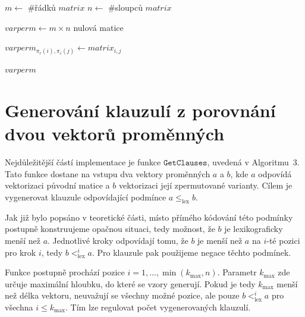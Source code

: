 \begin{algorithm}[H]
\begin{algorithmic}[1]
    	\State $m \gets$ \#řádků $matrix$
    	\State $n \gets$ \#sloupců $matrix$
    
    	\State $varperm \gets m\times n$ nulová matice 
    
            		\State $varperm_{\pi_r(i),\pi_c(j)} \gets matrix_{i,j}$
        	\EndFor
    	\EndFor
    
    	\State \Return $varperm$
\EndFunction
\end{algorithmic}
\caption{Aplikace permutací na matici}
\end{algorithm}

\section{Generování klauzulí z porovnání dvou vektorů proměnných}

Nejdůležitější částí implementace je funkce $\texttt{GetClauses}$, uvedená v Algoritmu 3. Tato funkce dostane na vstupu dva vektory proměnných $a$ a $b$, kde $a$ odpovídá vektorizaci původní matice a $b$ vektorizaci její zpermutované varianty. Cílem je vygenerovat klauzule odpovídající podmínce
$a \leq_{\text{lex}} b$.

Jak již bylo popsáno v teoretické části, místo přímého kódování této podmínky postupně konstruujeme opačnou situaci, tedy možnost, že $b$ je lexikograficky menší než $a$. Jednotlivé kroky odpovídají tomu, že $b$ je menší než $a$ na $i$-té pozici pro krok $i$, tedy $b <^i_{\text{lex}} a$. Pro klauzule pak použijeme negace těchto podmínek.

Funkce postupně prochází pozice $i = 1,\ldots,\min(k_{\max},n)$. Parametr $k_{\max}$ zde určuje maximální hloubku, do které se vzory generují. Pokud je tedy $k_{\max}$ menší než délka vektoru, neuvažují se všechny možné pozice, ale pouze $b <^i_{\text{lex}} a$ pro všechna $i \leq k_{\max}$. Tím lze regulovat počet vygenerovaných klauzulí.

